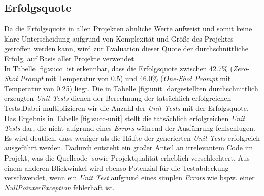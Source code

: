 \subsection{Erfolgsquote}
Da die Erfolgsquote in allen Projekten ähnliche Werte aufweist und somit keine klare Unterscheidung aufgrund von Komplexität und Größe des Projektes getroffen werden kann, wird zur Evaluation dieser Quote der durchschnittliche Erfolg, auf Basis aller Projekte verwendet.\\
In Tabelle \ref{fig:succ} ist erkennbar, dass die Erfolgsquote zwischen 42.7\% (\textit{Zero-Shot Prompt} mit Temperatur von 0.5) und 46.0\% (\textit{One-Shot Prompt} mit Temperatur von 0.25) liegt. Die in Tabelle \ref{fig:unit} dargestellten durchschnittlich erzeugten \textit{Unit Tests} dienen der Berechnung der tatsächlich erfolgreichen Tests.Dabei multiplizieren wir die Anzahl der \textit{Unit Tests} mit der Erfolgsquote. Das Ergebnis in Tabelle \ref{fig:succ-unit} stellt die tatsächlich erfolgreichen  \textit{Unit Tests} dar, die nicht aufgrund eines \textit{Errors} während der Ausführung fehlschlugen.  Es wird deutlich, dass weniger als die Hälfte der generierten  \textit{Unit Tests} erfolgreich ausgeführt werden. Dadurch entsteht ein großer Anteil an irrelevantem Code im Projekt, was die Quellcode- sowie Projektqualität erheblich verschlechtert. Aus einem anderen Blickwinkel wird ebenso Potenzial für die Testabdeckung verschwendet, wenn ein  \textit{Unit Test} aufgrund eines simplen \textit{Errors} wie bspw. einer \textit{NullPointerException} fehlerhaft ist.

